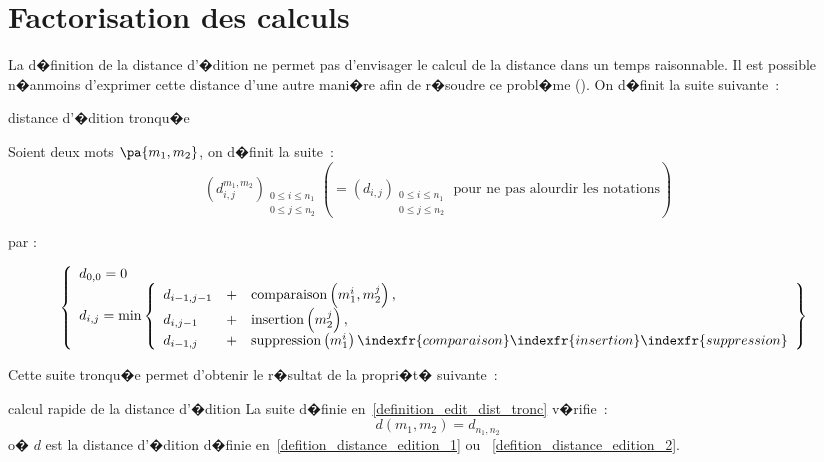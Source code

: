 \section{Factorisation des calculs}

La d�finition de la distance d'�dition ne permet pas d'envisager le calcul de la distance dans un temps raisonnable. Il
est possible n�anmoins d'exprimer cette distance d'une autre mani�re afin de r�soudre ce probl�me
(). On d�finit la suite suivante~:

		\begin{xdefinition}{distance d'�dition tronqu�e} \label{definition_edit_dist_tronc}
		
		Soient deux mots $\pa{m_1,m_2}$, on d�finit la suite~:
		    $$
		    \left( d_{i,j}^{m_{1},m_{2}}\right) _{\substack{0\leqslant
		    i\leqslant n_{1}\\0\leqslant j\leqslant n_{2}}}\left( =\left(d_{i,j}\right) _{\substack{0\leqslant i\leqslant
		    n_{1}\\0\leqslant
		    j\leqslant n_{2}}}\text{ pour ne pas alourdir les notations}\right)
		    $$
		
		par :%
		
		    $$
		    \left\{
		    \begin{array}[c]{l}%
		    d_{0,0}=0\\
		    d_{i,j}=\min\left\{
		    \begin{array}{lll}
		    d_{i-1,j-1}	&	+	& \text{comparaison}	\left(  m_1^i,m_2^j\right), \\
		    d_{i,j-1}		&	+	& \text{insertion}		\left(  m_2^j\right), \\
		    d_{i-1,j}		&	+	& \text{suppression}	\left(  m_1^i\right)
		    \indexfr{comparaison}
		    \indexfr{insertion}
		    \indexfr{suppression}
		    \end{array}
		    \right\}%
		    \end{array}
		    \right.
		    $$
		\end{xdefinition}
		

Cette suite tronqu�e permet d'obtenir le r�sultat de la propri�t� suivante~:

		\begin{xproperty}{calcul rapide de la distance d'�dition}
		\label{edition_distance_propriete_001}%
		La suite d�finie en~\ref{definition_edit_dist_tronc} v�rifie~:
		    $$
		    d\left(  m_{1},m_{2}\right)  =d_{n_{1},n_{2}}
		    $$
		o� $d$ est la distance d'�dition d�finie en~\ref{defition_distance_edition_1} ou ~\ref{defition_distance_edition_2}.
		\end{xproperty}





